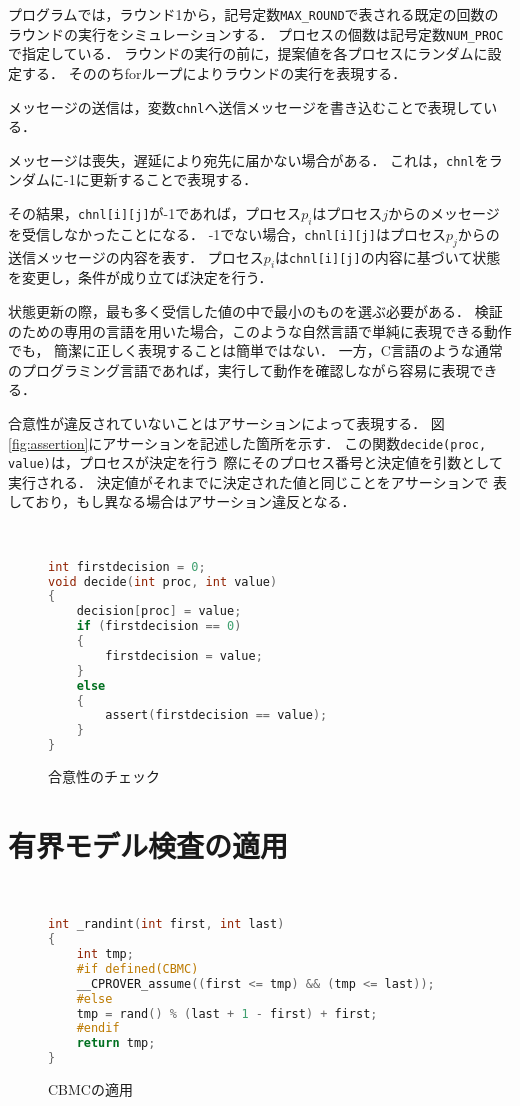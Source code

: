 \documentclass[technicalreport]{ieicej}
\theoremstyle{plain}
\begin{document}
プログラムでは，ラウンド1から，記号定数\verb|MAX_ROUND|で表される既定の回数のラウンドの実行をシミュレーションする．
プロセスの個数は記号定数\verb|NUM_PROC|で指定している．
ラウンドの実行の前に，提案値を各プロセスにランダムに設定する．
そののちforループによりラウンドの実行を表現する．

メッセージの送信は，変数\verb|chnl|へ送信メッセージを書き込むことで表現している．

メッセージは喪失，遅延により宛先に届かない場合がある．
これは，\verb|chnl|をランダムに-1に更新することで表現する．

その結果，\verb|chnl[i][j]|が-1であれば，プロセス$p_i$はプロセス$j$からのメッセージを受信しなかったことになる．
-1でない場合，\verb|chnl[i][j]|はプロセス$p_j$からの送信メッセージの内容を表す．
プロセス$p_i$は\verb|chnl[i][j]|の内容に基づいて状態を変更し，条件が成り立てば決定を行う．

状態更新の際，最も多く受信した値の中で最小のものを選ぶ必要がある．
検証のための専用の言語を用いた場合，このような自然言語で単純に表現できる動作でも，
簡潔に正しく表現することは簡単ではない．
一方，C言語のような通常のプログラミング言語であれば，実行して動作を確認しながら容易に表現できる．

合意性が違反されていないことはアサーションによって表現する．
図\ref{fig:assertion}にアサーションを記述した箇所を示す．
この関数\verb|decide(proc, value)|は，プロセスが決定を行う
際にそのプロセス番号と決定値を引数として実行される．
決定値がそれまでに決定された値と同じことをアサーションで
表しており，もし異なる場合はアサーション違反となる．

\begin{figure}[t]
\centering　{\scriptsize
	\begin{lstlisting}[language=c]
int firstdecision = 0;
void decide(int proc, int value) 
{
	decision[proc] = value;
	if (firstdecision == 0)
	{
		firstdecision = value;
	}
	else
	{
		assert(firstdecision == value);
	}
}
\end{lstlisting}}
\caption{合意性のチェック}\label{fig:assert}
\end{figure}          


\section{有界モデル検査の適用}\label{sec:cmbc}
\begin{figure}[t]
    \centering　{\scriptsize
\begin{lstlisting}[language=c]
int _randint(int first, int last)
{
    int tmp;
    #if defined(CBMC)
    __CPROVER_assume((first <= tmp) && (tmp <= last));
    #else
    tmp = rand() % (last + 1 - first) + first;
    #endif
    return tmp;
}
\end{lstlisting}}

        \caption{CBMCの適用}\label{fig:cbmc}
    \end{figure}          
   
\end{document}
